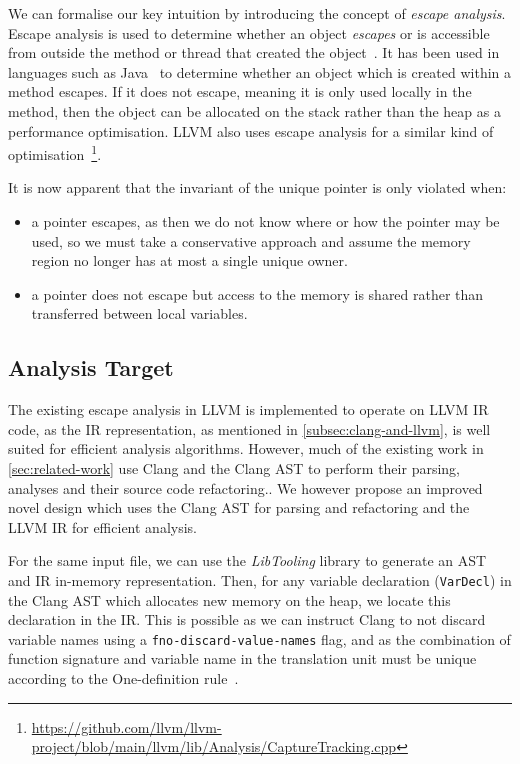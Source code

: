 \documentclass{mpaper}
\begin{document}
    We can formalise our key intuition by introducing the concept of \emph{escape analysis}.
    Escape analysis is used to determine whether an object \emph{escapes} or is accessible from outside the method or thread that created the object~\cite{Choi1999}.
    It has been used in languages such as Java~\cite{Choi1999} to determine whether an object which is created within a method escapes.
    If it does not escape, meaning it is only used locally in the method, then the object can be allocated on the stack rather than the heap as a performance optimisation.
    LLVM also uses escape analysis for a similar kind of optimisation~\footnote{\url{https://github.com/llvm/llvm-project/blob/main/llvm/lib/Analysis/CaptureTracking.cpp}}.
    
    It is now apparent that the invariant of the unique pointer is only violated when:
    \begin{itemize}
        \item a pointer escapes, as then we do not know where or how the pointer may be used, so we must take a conservative approach and assume the memory region no longer has at most a single unique owner.
        \item a pointer does not escape but access to the memory is shared rather than transferred between local variables. 
    \end{itemize}
    
    \subsection{Analysis Target}\label{subsec:methodology-analysistarget}
    
    The existing escape analysis in LLVM is implemented to operate on LLVM IR code, as the IR representation, as mentioned in \autoref{subsec:clang-and-llvm}, is well suited for efficient analysis algorithms. 
    However, much of the existing work in \autoref{sec:related-work} use Clang and the Clang AST to perform their parsing, analyses and their source code refactoring..
    We however propose an improved novel design which uses the Clang AST for parsing and refactoring and the LLVM IR for efficient analysis.
    
    For the same input file, we can use the \emph{LibTooling} library to generate an AST and IR in-memory representation.
    Then, for any variable declaration (\texttt{VarDecl}) in the Clang AST which allocates new memory on the heap, we locate this declaration in the IR.
    This is possible as we can instruct Clang to not discard variable names using a \texttt{fno-discard-value-names} flag, and as the combination of function signature and variable name in the translation unit must be unique according to the One-definition rule~\cite{C++17}. 
    
\end{document}
